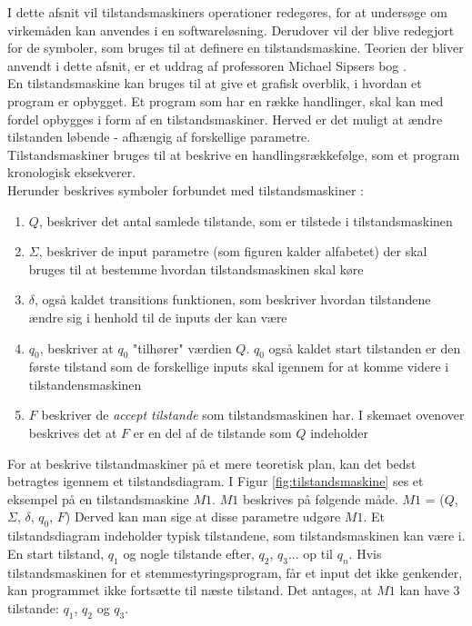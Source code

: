\label{sec:tilstandsmaskine}
I dette afsnit vil tilstandsmaskiners operationer redegøres, for at undersøge om virkemåden kan anvendes i en softwareløsning. Derudover vil der blive redegjort for de symboler, som bruges til at definere en tilstandsmaskine. Teorien der bliver anvendt i dette afsnit, er et uddrag af professoren Michael Sipsers bog \cite{ComputationTheory}. \\
En tilstandsmaskine kan bruges til at give et grafisk overblik, i hvordan et program er opbygget. Et program som har en række handlinger, skal kan med fordel opbygges i form af en tilstandsmaskiner. Herved er det muligt at ændre tilstanden løbende - afhængig af forskellige parametre. \\

Tilstandsmaskiner bruges til at beskrive en handlingsrækkefølge, som et program kronologisk eksekverer. \\

Herunder beskrives symboler forbundet med tilstandsmaskiner :
\begin{enumerate}
    \item $Q$, beskriver det antal samlede tilstande, som er tilstede i tilstandsmaskinen
    \item $\Sigma$, beskriver de input parametre (som figuren kalder alfabetet) der skal bruges til at bestemme hvordan tilstandsmaskinen skal køre
    \item $\delta$, også kaldet transitions funktionen, som beskriver hvordan tilstandene ændre sig i henhold til de inputs der kan være
    \item $q_0$, beskriver at $q_0$ "tilhører" værdien $Q$. $q_0$ også kaldet start tilstanden er den første tilstand som de forskellige inputs skal igennem for at komme videre i tilstandensmaskinen
    \item $F$ beskriver de \textit{accept tilstande} som tilstandsmaskinen har. I skemaet ovenover beskrives det at $F$ er en del af de tilstande som $Q$ indeholder
\end{enumerate}

For at beskrive tilstandmaskiner på et mere teoretisk plan, kan det bedst betragtes igennem et tilstandsdiagram. I Figur \ref{fig:tilstandsmaskine} ses et eksempel på en tilstandsmaskine $M1$. $M1$ beskrives på følgende måde. $M1$ = ($Q$,$\Sigma$, $\delta$, $q_0$, $F$) Derved kan man sige at disse parametre udgøre $M1$.
Et tilstandsdiagram indeholder typisk tilstandene, som tilstandsmaskinen kan være i. \\ 
En start tilstand, $q_1$ og nogle tilstande efter, $q_2$, $q_3$... op til $q_n$. Hvis tilstandsmaskinen for et stemmestyringsprogram, får et input det ikke genkender, kan programmet ikke fortsætte til næste tilstand. 
Det antages, at $M1$ kan have 3 tilstande: $q_1$, $q_2$ og $q_3$.\\

